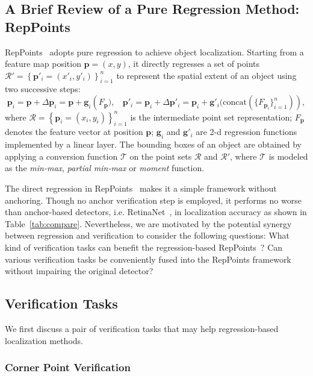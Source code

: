 \documentclass{article}
\begin{document}
\subsection{A Brief Review of a Pure Regression Method: RepPoints}
\label{sec:review}
RepPoints~\cite{yang19reppts} adopts pure regression to achieve object localization. Starting from a feature map position $\mathbf{p}=(x,y)$, it directly regresses a set of points $\mathcal{R}' = \left\{\mathbf{p}'_i = (x'_i, y'_i)\right\}_{i=1}^{n}$ to represent the spatial extent of an object using two successive steps:
\begin{equation}
    \mathbf{p}_i = \mathbf{p} + \Delta \mathbf{p}_i = \mathbf{p} + \mathbf{g}_i\left(F_{\mathbf{p}}),~~~~\mathbf{p}'_i = \mathbf{p}_i + \Delta \mathbf{p}'_i = \mathbf{p}_i + \mathbf{g}'_i(\text{concat}(\{F_{\mathbf{p}_i}\}_{i=1}^n)\right),
\end{equation}
where $\mathcal{R} = \left\{\mathbf{p}_i = (x_i, y_i)\right\}_{i=1}^{n}$ is the intermediate point set representation; $F_\mathbf{p}$ denotes the feature vector at position $\mathbf{p}$; $\mathbf{g}_i$ and $\mathbf{g}'_i$ are 2-d regression functions implemented by a linear layer. The bounding boxes of an object are obtained by applying a conversion function $\mathcal{T}$ on the point sets $\mathcal{R}$ and $\mathcal{R}'$, where $\mathcal{T}$ is modeled as the \emph{min-max}, \emph{partial min-max} or \emph{moment} function.

The direct regression in RepPoints~\cite{yang19reppts} makes it a simple framework without anchoring. Though no anchor verification step is employed, it performs no worse than anchor-based detectors, i.e. RetinaNet~\cite{RetinaNet}, in localization accuracy as shown in Table~\ref{tab:compare}. Nevertheless, we are motivated by the potential synergy between regression and verification to consider the following questions: 
What kind of verification tasks can benefit the regression-based RepPoints~\cite{yang19reppts}? Can various verification tasks be conveniently fused into the RepPoints framework without impairing the original detector?

\subsection{Verification Tasks}

We first discuss a pair of verification tasks that may help regression-based localization methods.

\subsubsection{Corner Point Verification}
\end{document}
